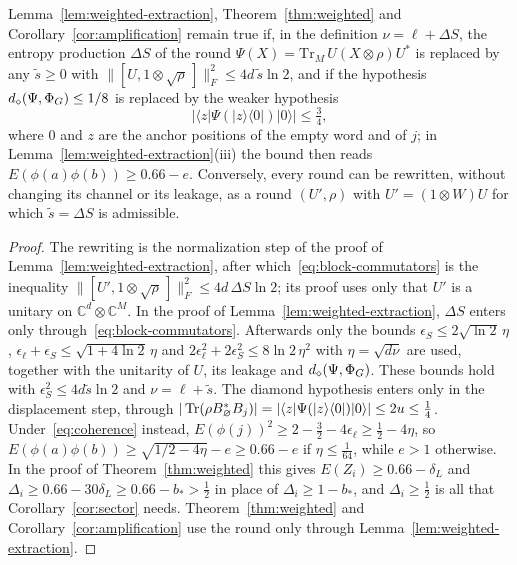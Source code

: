 \begin{lemma}\label{lem:commutator-form}
Lemma~\ref{lem:weighted-extraction}, Theorem~\ref{thm:weighted} and Corollary~\ref{cor:amplification} remain true if, in the definition
$\nu=\ell+\Delta S$, the entropy production $\Delta S$ of the round $\Psi(X)=\mathrm{Tr}_M\,U(X\otimes\rho)U^*$ is replaced by any $\tilde s\ge0$ with
$\|[U,1\otimes\sqrt\rho\,]\|_F^2\le4d\,\tilde s\ln2$, and if the hypothesis $d_\diamond(\Psi,\Phi_G)\le1/8$ is replaced by the weaker hypothesis
\begin{equation}\label{eq:coherence}
|\langle z|\Psi(|z\rangle\langle0|)|0\rangle|\le\tfrac34,
\end{equation}
where $0$ and $z$ are the anchor positions of the empty word and of $j$; in Lemma~\ref{lem:weighted-extraction}(iii) the bound then reads
$E(\phi(a)\phi(b))\ge0.66-e$. Conversely, every round can be rewritten, without changing its channel or its leakage, as a round
$(U',\rho)$ with $U'=(1\otimes W)U$ for which $\tilde s=\Delta S$ is admissible.
\end{lemma}

\begin{proof}
The rewriting is the normalization step of the proof of Lemma~\ref{lem:weighted-extraction}, after which~\eqref{eq:block-commutators} is
the inequality $\|[U',1\otimes\sqrt\rho\,]\|_F^2\le4d\,\Delta S\ln2$; its proof uses only that $U'$ is a unitary on $\mathbb C^d\otimes\mathbb C^M$. In
the proof of Lemma~\ref{lem:weighted-extraction}, $\Delta S$ enters only through~\eqref{eq:block-commutators}. Afterwards only the bounds
$\epsilon_S\le2\sqrt{\ln2}\,\eta$, $\epsilon_\ell+\epsilon_S\le\sqrt{1+4\ln2}\,\eta$ and $2\epsilon_\ell^2+2\epsilon_S^2\le8\ln2\,\eta^2$ with $\eta=\sqrt{d\nu}$ are used,
together with the unitarity of $U$, its leakage and $d_\diamond(\Psi,\Phi_G)$. These bounds hold with $\epsilon_S^2\le4d\tilde s\ln2$ and $\nu=\ell+\tilde s$.
The diamond hypothesis enters only in the displacement step, through
$|\operatorname{Tr}(\rho B_\varnothing^*B_j)|=|\langle z|\Psi(|z\rangle\langle0|)|0\rangle|\le2u\le\frac14$. Under~\eqref{eq:coherence} instead,
$E(\phi(j))^2\ge2-\frac32-4\epsilon_\ell\ge\frac12-4\eta$, so $E(\phi(a)\phi(b))\ge\sqrt{1/2-4\eta}-e\ge0.66-e$ if $\eta\le\frac1{64}$, while $e>1$ otherwise. In
the proof of Theorem~\ref{thm:weighted} this gives $E(Z_i)\ge0.66-\delta_L$ and $\Delta_i\ge0.66-30\delta_L\ge0.66-b_*>\frac12$ in place of
$\Delta_i\ge1-b_*$, and $\Delta_i\ge\frac12$ is all that Corollary~\ref{cor:sector} needs. Theorem~\ref{thm:weighted} and Corollary~\ref{cor:amplification} use
the round only through Lemma~\ref{lem:weighted-extraction}.
\end{proof}

